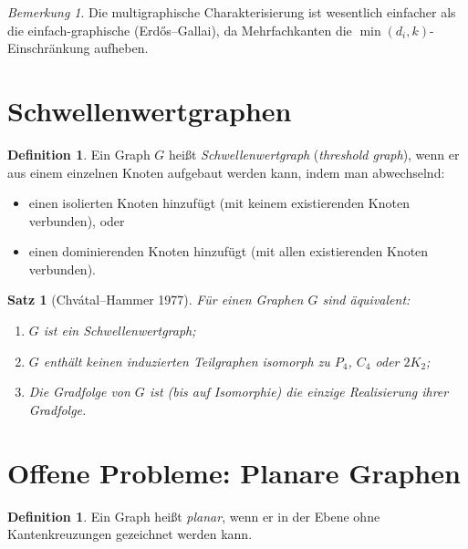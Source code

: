 \documentclass[12pt,a4paper]{amsart}
\newtheorem{satz}[theorem]{Satz}
\theoremstyle{definition}
\newtheorem{definition_de}[theorem]{Definition}
\theoremstyle{remark}
\newtheorem{bemerkung}[theorem]{Bemerkung}
\begin{document}
\begin{bemerkung}
Die multigraphische Charakterisierung ist wesentlich einfacher als die
einfach-graphische (Erd\H{o}s--Gallai), da Mehrfachkanten die
$\min(d_i, k)$-Einschränkung aufheben.
\end{bemerkung}

\section{Schwellenwertgraphen}

\begin{definition_de}
Ein Graph $G$ heißt \emph{Schwellenwertgraph} (\textit{threshold graph}),
wenn er aus einem einzelnen Knoten aufgebaut werden kann, indem man abwechselnd:
\begin{itemize}[nosep]
  \item einen isolierten Knoten hinzufügt (mit keinem existierenden Knoten verbunden), oder
  \item einen dominierenden Knoten hinzufügt (mit allen existierenden Knoten verbunden).
\end{itemize}
\end{definition_de}

\begin{satz}[Chvátal--Hammer 1977]
Für einen Graphen $G$ sind äquivalent:
\begin{enumerate}[label=(\roman*)]
  \item $G$ ist ein Schwellenwertgraph;
  \item $G$ enthält keinen induzierten Teilgraphen isomorph zu $P_4$, $C_4$ oder $2K_2$;
  \item Die Gradfolge von $G$ ist (bis auf Isomorphie) die einzige Realisierung
        ihrer Gradfolge.
\end{enumerate}
\end{satz}

\section{Offene Probleme: Planare Graphen}

\begin{definition_de}
Ein Graph heißt \emph{planar}, wenn er in der Ebene ohne Kantenkreuzungen
gezeichnet werden kann.
\end{definition_de}
\end{document}
